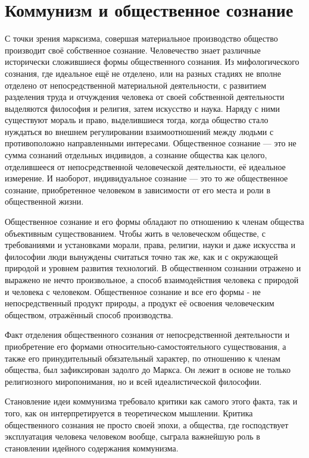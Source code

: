 \documentclass[../main]{subfiles}
\begin{document}
\ifSubfilesClassLoaded{\setcounter{page}{54}}{}
\section{Коммунизм и общественное сознание}
\label{sec:10_kommunizm_soznanie}

С точки зрения марксизма, совершая материальное производство общество производит своё собственное сознание. Человечество знает различные исторически сложившиеся формы общественного сознания. Из мифологического сознания, где идеальное ещё не отделено, или на разных стадиях не вполне отделено от непосредственной материальной деятельности, с развитием разделения труда и отчуждения человека от своей собственной деятельности выделяются философия и религия, затем искусство и наука. Наряду с ними существуют мораль и право, выделившиеся тогда, когда общество стало нуждаться во внешнем регулировании взаимоотношений между людьми с противоположно направленными интересами. Общественное сознание — это не сумма сознаний отдельных индивидов, а сознание общества как целого, отделившееся от непосредственной человеческой деятельности, её идеальное измерение. И наоборот, индивидуальное сознание — это то же общественное сознание, приобретенное человеком в зависимости от его места и роли в общественной жизни.

Общественное сознание и его формы обладают по отношению к членам общества объективным существованием. Чтобы жить в человеческом обществе, с требованиями и установками морали, права, религии, науки и даже искусства и философии люди вынуждены считаться точно так же, как и с окружающей природой и уровнем развития технологий. В общественном сознании отражено и выражено не нечто произвольное, а способ взаимодействия человека с природой и человека с человеком. Общественное сознание и все его формы - не непосредственный продукт природы, а продукт её освоения человеческим обществом, отражённый способ производства.

Факт отделения общественного сознания от непосредственной деятельности и приобретение его формами относительно-самостоятельного существования, а также его принудительный обязательный характер, по отношению к членам общества, был зафиксирован задолго до Маркса. Он лежит в основе не только религиозного миропонимания, но и всей идеалистической философии.

Становление идеи коммунизма требовало критики как самого этого факта, так и того, как он интерпретируется в теоретическом мышлении. Критика общественного сознания не просто своей эпохи, а общества, где господствует эксплуатация человека человеком вообще, сыграла важнейшую роль в становлении идейного содержания коммунизма.
\end{document}
